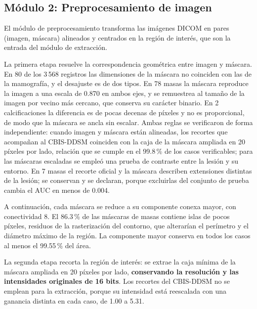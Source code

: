 
\subsection{Módulo 2: Preprocesamiento de imagen}
\label{sec:modulo2}

El módulo de preprocesamiento transforma las imágenes DICOM en pares (imagen, máscara) alineados y
centrados en la región de interés, que son la entrada del módulo de extracción.

La primera etapa resuelve la correspondencia geométrica entre imagen y máscara. En 80 de los
3\,568 registros las dimensiones de la máscara no coinciden con las de la mamografía, y el desajuste
es de dos tipos. En 78 masas la máscara reproduce la imagen a una escala de 0.870 en ambos ejes, y se
remuestrea al tamaño de la imagen por vecino más cercano, que conserva su carácter binario. En
2 calcificaciones la diferencia es de pocas decenas de píxeles y no es proporcional, de modo que la
máscara se ancla sin escalar. Ambas reglas se verificaron de forma independiente: cuando imagen y
máscara están alineadas, los recortes que acompañan al CBIS-DDSM coinciden con la caja de la máscara
ampliada en 20 píxeles por lado, relación que se cumple en el 99.8\,\% de los casos
verificables; para las máscaras escaladas se empleó una prueba de contraste entre la lesión y su
entorno. En 7 masas el recorte oficial y la máscara describen extensiones distintas de la lesión; se
conservan y se declaran, porque excluirlas del conjunto de prueba cambia el AUC en menos de 0.004.

A continuación, cada máscara se reduce a su componente conexa mayor, con conectividad 8. El
86.3\,\% de las máscaras de masas contiene islas de pocos píxeles, residuos de la
rasterización del contorno, que alterarían el perímetro y el diámetro máximo de la región. La
componente mayor conserva en todos los casos al menos el 99.55\,\% del área.

La segunda etapa recorta la región de interés: se extrae la caja mínima de la máscara ampliada en
20 píxeles por lado, \textbf{conservando la resolución y las intensidades originales de 16 bits}.
Los recortes del CBIS-DDSM no se emplean para la extracción, porque su intensidad está reescalada
con una ganancia distinta en cada caso, de 1.00 a 5.31.

